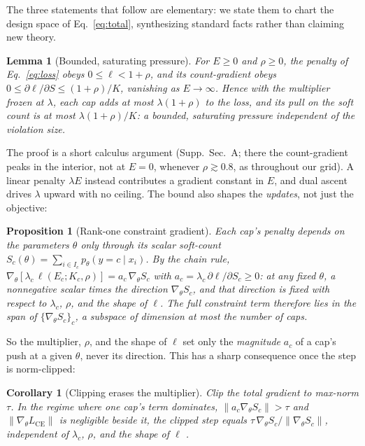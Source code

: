 \documentclass[letterpaper]{article} %
\newtheorem{proposition}{Proposition}  %
\newtheorem{lemma}{Lemma}
\newtheorem{corollary}{Corollary}
\begin{document}
The three statements that follow are elementary: we state them to chart the design space of
Eq.~\eqref{eq:total}, synthesizing standard facts rather than claiming new theory.

\begin{lemma}[Bounded, saturating pressure]
\label{lem:bound}
For $E\ge 0$ and $\rho\ge 0$, the penalty of Eq.~\eqref{eq:loss} obeys $0\le\ell<1+\rho$,
and its count-gradient obeys $0\le\partial\ell/\partial S\le(1+\rho)/K$, vanishing as
$E\to\infty$. Hence with the multiplier frozen at $\lambda$, each cap adds at most
$\lambda(1+\rho)$ to the loss, and its pull on the soft count is at most $\lambda(1+\rho)/K$:
a bounded, saturating pressure \emph{independent of the violation size}.
\end{lemma}

\noindent The proof is a short calculus argument (Supp.~Sec.~A; there the count-gradient
peaks in the interior, not at $E{=}0$, whenever $\rho\gtrsim0.8$, as throughout our grid). A
linear penalty $\lambda E$ instead contributes a gradient constant in $E$, and dual ascent
drives $\lambda$ upward with no ceiling. The bound also shapes the \emph{updates}, not just
the objective:

\begin{proposition}[Rank-one constraint gradient]
\label{prop:rank1}
Each cap's penalty depends on the parameters $\theta$ only through its scalar soft-count
$S_c(\theta)=\sum_{i\in I_c}p_\theta(y{=}c\mid x_i)$. By the chain rule,
$\nabla_\theta[\lambda_c\,\ell(E_c;K_c,\rho)]=a_c\,\nabla_\theta S_c$ with
$a_c=\lambda_c\,\partial\ell/\partial S_c\ge 0$: at any fixed $\theta$, a nonnegative scalar
times the direction $\nabla_\theta S_c$, and that direction is fixed with respect to
$\lambda_c$, $\rho$, and the shape of $\ell$. The full constraint term therefore lies in the
span of $\{\nabla_\theta S_c\}_c$, a subspace of dimension at most the number of caps.
\end{proposition}

\noindent So the multiplier, $\rho$, and the shape of $\ell$ set only the \emph{magnitude}
$a_c$ of a cap's push at a given $\theta$, never its direction. This has a sharp consequence
once the step is norm-clipped:

\begin{corollary}[Clipping erases the multiplier]
\label{cor:clip}
Clip the total gradient to max-norm $\tau$. In the regime where one cap's term dominates,
$\lVert a_c\nabla_\theta S_c\rVert>\tau$ and $\lVert\nabla_\theta L_{\text{CE}}\rVert$ is
negligible beside it, the clipped step equals $\tau\,\nabla_\theta
S_c/\lVert\nabla_\theta S_c\rVert$, independent of $\lambda_c$, $\rho$, and the shape of
$\ell$ \citep{pascanu2013difficulty}.
\end{corollary}
\end{document}
